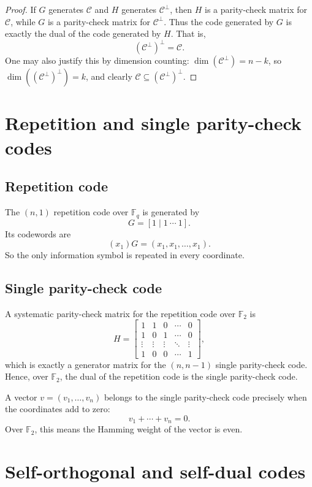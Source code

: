 \documentclass[11pt]{article}
\theoremstyle{definition}
\theoremstyle{remark}
\newcommand{\F}{\mathbb{F}}
\newcommand{\code}{\mathcal{C}}
\newcommand{\dual}[1]{#1^{\perp}}
\begin{document}
\begin{proof}
If $G$ generates $\code$ and $H$ generates $\dual{\code}$, then $H$ is a parity-check matrix for $\code$, while $G$ is a parity-check matrix for $\dual{\code}$. Thus the code generated by $G$ is exactly the dual of the code generated by $H$. That is,
\[
(\dual{\code})^{\perp}=\code.
\]
One may also justify this by dimension counting: $\dim(\dual{\code})=n-k$, so $\dim((\dual{\code})^{\perp})=k$, and clearly $\code\subseteq (\dual{\code})^{\perp}$.
\end{proof}

\section{Repetition and single parity-check codes}

\subsection{Repetition code}

The $(n,1)$ repetition code over $\F_q$ is generated by
\[
G=[1\mid 1\ \cdots\ 1].
\]
Its codewords are
\[
(x_1)G=(x_1,x_1,\dots,x_1).
\]
So the only information symbol is repeated in every coordinate.

\subsection{Single parity-check code}

A systematic parity-check matrix for the repetition code over $\F_2$ is
\[
H=
\begin{bmatrix}
1&1&0&\cdots&0\\
1&0&1&\cdots&0\\
\vdots&\vdots&\vdots&\ddots&\vdots\\
1&0&0&\cdots&1
\end{bmatrix},
\]
which is exactly a generator matrix for the $(n,n-1)$ single parity-check code. Hence, over $\F_2$, the dual of the repetition code is the single parity-check code.

A vector $v=(v_1,\dots,v_n)$ belongs to the single parity-check code precisely when the coordinates add to zero:
\[
v_1+\cdots+v_n=0.
\]
Over $\F_2$, this means the Hamming weight of the vector is even.

\section{Self-orthogonal and self-dual codes}
\end{document}
